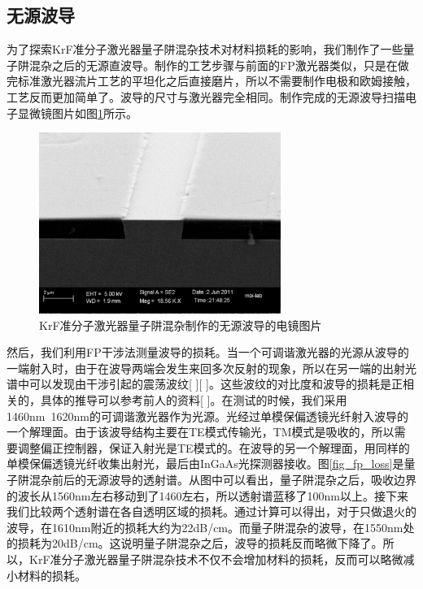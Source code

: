 \documentclass{ZJUthesis}
\begin{document}
\subsection{无源波导}

为了探索KrF准分子激光器量子阱混杂技术对材料损耗的影响，我们制作了一些量子阱混杂之后的无源直波导。制作的工艺步骤与前面的FP激光器类似，只是在做完标准激光器流片工艺的平坦化之后直接磨片，所以不需要制作电极和欧姆接触，工艺反而更加简单了。波导的尺寸与激光器完全相同。制作完成的无源波导扫描电子显微镜图片如图\ref{fig_wg}所示。

\begin{figure}[!t]
    \centering
    \includegraphics[width=0.7\textwidth]{./Pictures/wg.eps}
    \caption{KrF准分子激光器量子阱混杂制作的无源波导的电镜图片}
    \label{fig_wg}
\end{figure}

然后，我们利用FP干涉法测量波导的损耗。当一个可调谐激光器的光源从波导的一端射入时，由于在波导两端会发生来回多次反射的现象，所以在另一端的出射光谱中可以发现由干涉引起的震荡波纹[ ][ ]。这些波纹的对比度和波导的损耗是正相关的，具体的推导可以参考前人的资料[ ]。在测试的时候，我们采用1460nm~1620nm的可调谐激光器作为光源。光经过单模保偏透镜光纤射入波导的一个解理面。由于该波导结构主要在TE模式传输光，TM模式是吸收的，所以需要调整偏正控制器，保证入射光是TE模式的。在波导的另一个解理面，用同样的单模保偏透镜光纤收集出射光，最后由InGaAs光探测器接收。图\ref{fig_fp_loss}是量子阱混杂前后的无源波导的透射谱。从图中可以看出，量子阱混杂之后，吸收边界的波长从1560nm左右移动到了1460左右，所以透射谱蓝移了100nm以上。接下来我们比较两个透射谱在各自透明区域的损耗。通过计算可以得出，对于只做退火的波导，在1610nm附近的损耗大约为22dB/cm。而量子阱混杂的波导，在1550nm处的损耗为20dB/cm。这说明量子阱混杂之后，波导的损耗反而略微下降了。所以，KrF准分子激光器量子阱混杂技术不仅不会增加材料的损耗，反而可以略微减小材料的损耗。
\end{document}
